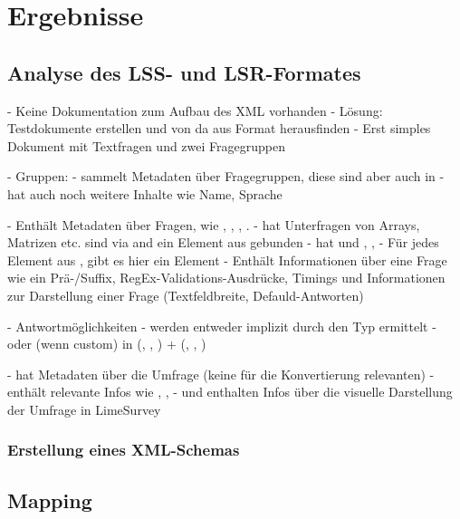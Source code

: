 \chapter{Ergebnisse}
\label{ch:ergebnisse}

\section{Analyse des LSS- und LSR-Formates}

- Keine Dokumentation zum Aufbau des XML vorhanden
- Lösung: Testdokumente erstellen und von da aus Format herausfinden
	- Erst simples Dokument mit Textfragen und zwei Fragegruppen

- Gruppen:
	-  sammelt Metadaten über Fragegruppen, diese sind aber auch in 
	-  hat auch noch weitere Inhalte wie Name, Sprache

-  Enthält Metadaten über Fragen, wie , , , .
-  hat Unterfragen von Arrays, Matrizen etc. sind via  and ein Element aus  gebunden
-  hat  und , , 
	- Für jedes Element aus ,  gibt es hier ein Element
-  Enthält Informationen über eine Frage wie ein Prä-/Suffix, RegEx-Validations-Ausdrücke, Timings und Informationen zur Darstellung einer Frage (Textfeldbreite, Defauld-Antworten) 

- Antwortmöglichkeiten
	- werden entweder implizit durch den Typ ermittelt
	- oder (wenn custom) in  (, , ) +  (, , )

-  hat Metadaten über die Umfrage (keine für die Konvertierung relevanten)
-  enthält relevante Infos wie , , 
-  und  enthalten Infos über die visuelle Darstellung der Umfrage in LimeSurvey

\subsection{Erstellung eines XML-Schemas}

\section{Mapping}

